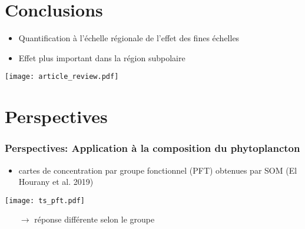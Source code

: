 \documentclass[11pt, french, aspectratio=32]{beamer}
\begin{document}

\section{Conclusions}

\begin{frame}


  \begin{itemize}
          \setlength{\itemsep}{0.8em}
    \item Quantification à l'échelle régionale de l'effet des fines échelles
    \item Effet plus important dans la région subpolaire
  \end{itemize}


  \texttt{[image: article\_review.pdf]}

\end{frame}

\section{Perspectives}


\begin{frame}
  \frametitle{Perspectives: Application à la composition du phytoplancton}

  \begin{itemize}
    \item cartes de concentration par groupe fonctionnel (PFT) obtenues par SOM (El Hourany et al. 2019)
  \end{itemize}

  \vfill
  \texttt{[image: ts\_pft.pdf]}
  \vfill

  \begin{itemize}
    \item[$\longrightarrow$] réponse différente selon le groupe
  \end{itemize}
\end{frame}
\end{document}
